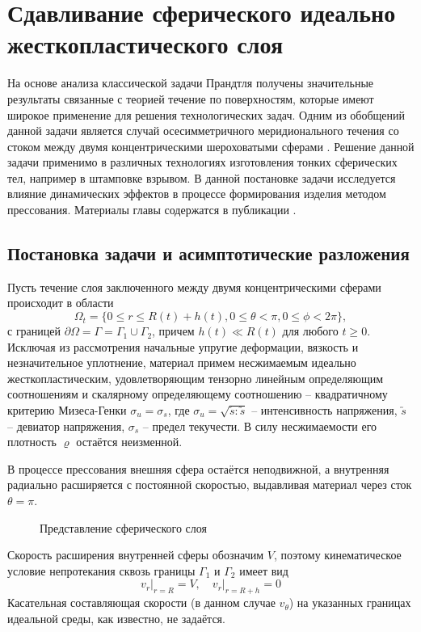 \chapter{Сдавливание сферического идеально жесткопластического слоя}\label{ch:ch3}
На основе анализа классической задачи Прандтля \autocite{Prandtl:1948} получены значительные результаты связанные с теорией течение по поверхностям, которые имеют широкое применение для решения технологических задач. Одним из обобщений данной задачи является случай осесимметричного меридионального течения со стоком между двумя концентрическими шероховатыми сферами \autocite{Georgievsky:2011}.
Решение данной задачи применимо в различных технологиях изготовления тонких сферических тел, например в штамповке взрывом.
В данной постановке задачи исследуется влияние динамических эффектов в процессе формирования изделия методом прессования. Материалы главы содержатся в публикации \autocite{Shabaykin:2020a}.

\section{Постановка задачи и асимптотические разложения}\label{sec:ch3/sec1}

Пусть течение слоя заключенного между двумя концентрическими сферами происходит в области
\begin{equation}
  \Omega_{t} = \{0 \le r \le R(t)+ h(t), 0 \le \theta < \pi, 0 \le \phi < 2\pi\},
\end{equation}
с границей $\partial\Omega = \Gamma = \Gamma_{1} \cup \Gamma_{2}$, причем $h(t) \ll R(t)$ для любого $t \ge 0$.
Исключая из рассмотрения начальные упругие деформации, вязкость и незначительное уплотнение, материал примем несжимаемым идеально жесткопластическим, удовлетворяющим тензорно линейным определяющим соотношениям и скалярному определяющему соотношению -- квадратичному критерию Мизеса-Генки $\sigma_{u} = \sigma_{s}$, где $\sigma_{u} = \sqrt{\utilde{s} : \utilde{s}}$ -- интенсивность напряжения, $\utilde{s}$ -- девиатор напряжения, $\sigma_{s}$ -- предел текучести.
В силу несжимаемости его плотность $\varrho$ остаётся неизменной.

В процессе прессования внешняя сфера остаётся неподвижной, а внутренняя радиально расширяется с постоянной скоростью, выдавливая материал через сток $\theta=\pi$.

\begin{figure}[ht]
  \caption{Представление сферического слоя}
  \label{fig:ch3/layer/circle}
\end{figure}
Скорость расширения внутренней сферы обозначим $V$, поэтому кинематическое условие непротекания сквозь границы $\Gamma_{1}$ и $\Gamma_{2}$ имеет вид
\begin{equation}
  \label{eq:ch3/sec1/boundary/kinematic}
  v_{r}\lvert_{r=R} = V, \quad v_{r}\lvert_{r=R + h} = 0
\end{equation}
Касательная составляющая скорости (в данном случае $v_{\theta}$) на указанных границах идеальной среды, как известно, не задаётся.

